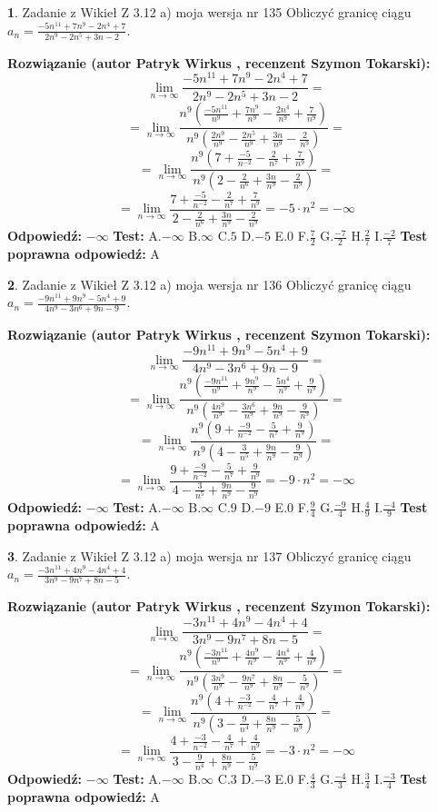 \documentclass[12pt, a4paper]{article}
\theoremstyle{definition} %
\newtheorem{zad}{}
\newcommand{\zadStart}[1]{\begin{zad}#1\newline}
\newcommand{\zadStop}{\end{zad}}
\newcommand{\rozwStart}[2]{\noindent \textbf{Rozwiązanie (autor #1 , recenzent #2): }\newline}
\newcommand{\rozwStop}{\newline}
\newcommand{\odpStart}{\noindent \textbf{Odpowiedź:}\newline}
\newcommand{\odpStop}{\newline}
\newcommand{\testStart}{\noindent \textbf{Test:}\newline}
\newcommand{\testStop}{\newline}
\newcommand{\kluczStart}{\noindent \textbf{Test poprawna odpowiedź:}\newline}
\newcommand{\kluczStop}{\newline}
\begin{document}
\zadStart{Zadanie z Wikieł Z 3.12 a) moja wersja nr 135}
Obliczyć granicę ciągu $a_{n}=\frac{-5n^{11}+7n^{9}-2n^{4}+7}{2n^{9}-2n^{5}+3n-2}$.
\zadStop
\rozwStart{Patryk Wirkus}{Szymon Tokarski}
$$\lim\limits_{n\to\infty}\frac{-5n^{11}+7n^{9}-2n^{4}+7}{2n^{9}-2n^{5}+3n-2}=$$
$$=\lim\limits_{n\to\infty}\frac{n^{9}\left(\frac{-5n^{11}}{n^{9}}+\frac{7n^{9}}{n^{9}}-\frac{2n^{4}}{n^{9}}+\frac{7}{n^{9}}\right)}{n^{9}\left(\frac{2n^{9}}{n^{9}}-\frac{2n^{5}}{n^{9}}+\frac{3n}{n^{9}}-\frac{2}{n^{9}}\right)}=$$
$$=\lim\limits_{n\to\infty}\frac{n^{9}\left(7+\frac{-5}{n^{-2}}-\frac{2}{n^{7}}+\frac{7}{n^{9}}\right)}
{n^{9}\left(2-\frac{2}{n^{6}}+\frac{3n}{n^{9}}-\frac{2}{n^{9}}\right)}=$$
$$=\lim\limits_{n\to\infty}\frac{7+\frac{-5}{n^{-2}}-\frac{2}{n^{7}}+\frac{7}{n^{9}}}{2-\frac{2}{n^{6}}+\frac{3n}{n^{9}}-\frac{2}{n^{9}}}=-5\cdot n^{2} = -\infty$$
\rozwStop
\odpStart
$-\infty$
\odpStop
\testStart
A.$-\infty$
B.$\infty$
C.$5$
D.$-5$
E.$0$
F.$\frac{7}{2}$
G.$\frac{-7}{2}$
H.$\frac{2}{7}$
I.$\frac{-2}{7}$
\testStop
\kluczStart
A
\kluczStop



\zadStart{Zadanie z Wikieł Z 3.12 a) moja wersja nr 136}
Obliczyć granicę ciągu $a_{n}=\frac{-9n^{11}+9n^{9}-5n^{4}+9}{4n^{9}-3n^{6}+9n-9}$.
\zadStop
\rozwStart{Patryk Wirkus}{Szymon Tokarski}
$$\lim\limits_{n\to\infty}\frac{-9n^{11}+9n^{9}-5n^{4}+9}{4n^{9}-3n^{6}+9n-9}=$$
$$=\lim\limits_{n\to\infty}\frac{n^{9}\left(\frac{-9n^{11}}{n^{9}}+\frac{9n^{9}}{n^{9}}-\frac{5n^{4}}{n^{9}}+\frac{9}{n^{9}}\right)}{n^{9}\left(\frac{4n^{9}}{n^{9}}-\frac{3n^{6}}{n^{9}}+\frac{9n}{n^{9}}-\frac{9}{n^{9}}\right)}=$$
$$=\lim\limits_{n\to\infty}\frac{n^{9}\left(9+\frac{-9}{n^{-2}}-\frac{5}{n^{7}}+\frac{9}{n^{9}}\right)}
{n^{9}\left(4-\frac{3}{n^{5}}+\frac{9n}{n^{9}}-\frac{9}{n^{9}}\right)}=$$
$$=\lim\limits_{n\to\infty}\frac{9+\frac{-9}{n^{-2}}-\frac{5}{n^{7}}+\frac{9}{n^{9}}}{4-\frac{3}{n^{5}}+\frac{9n}{n^{9}}-\frac{9}{n^{9}}}=-9\cdot n^{2} = -\infty$$
\rozwStop
\odpStart
$-\infty$
\odpStop
\testStart
A.$-\infty$
B.$\infty$
C.$9$
D.$-9$
E.$0$
F.$\frac{9}{4}$
G.$\frac{-9}{4}$
H.$\frac{4}{9}$
I.$\frac{-4}{9}$
\testStop
\kluczStart
A
\kluczStop



\zadStart{Zadanie z Wikieł Z 3.12 a) moja wersja nr 137}
Obliczyć granicę ciągu $a_{n}=\frac{-3n^{11}+4n^{9}-4n^{4}+4}{3n^{9}-9n^{7}+8n-5}$.
\zadStop
\rozwStart{Patryk Wirkus}{Szymon Tokarski}
$$\lim\limits_{n\to\infty}\frac{-3n^{11}+4n^{9}-4n^{4}+4}{3n^{9}-9n^{7}+8n-5}=$$
$$=\lim\limits_{n\to\infty}\frac{n^{9}\left(\frac{-3n^{11}}{n^{9}}+\frac{4n^{9}}{n^{9}}-\frac{4n^{4}}{n^{9}}+\frac{4}{n^{9}}\right)}{n^{9}\left(\frac{3n^{9}}{n^{9}}-\frac{9n^{7}}{n^{9}}+\frac{8n}{n^{9}}-\frac{5}{n^{9}}\right)}=$$
$$=\lim\limits_{n\to\infty}\frac{n^{9}\left(4+\frac{-3}{n^{-2}}-\frac{4}{n^{7}}+\frac{4}{n^{9}}\right)}
{n^{9}\left(3-\frac{9}{n^{4}}+\frac{8n}{n^{9}}-\frac{5}{n^{9}}\right)}=$$
$$=\lim\limits_{n\to\infty}\frac{4+\frac{-3}{n^{-2}}-\frac{4}{n^{7}}+\frac{4}{n^{9}}}{3-\frac{9}{n^{4}}+\frac{8n}{n^{9}}-\frac{5}{n^{9}}}=-3\cdot n^{2} = -\infty$$
\rozwStop
\odpStart
$-\infty$
\odpStop
\testStart
A.$-\infty$
B.$\infty$
C.$3$
D.$-3$
E.$0$
F.$\frac{4}{3}$
G.$\frac{-4}{3}$
H.$\frac{3}{4}$
I.$\frac{-3}{4}$
\testStop
\kluczStart
A
\kluczStop
\end{document}
